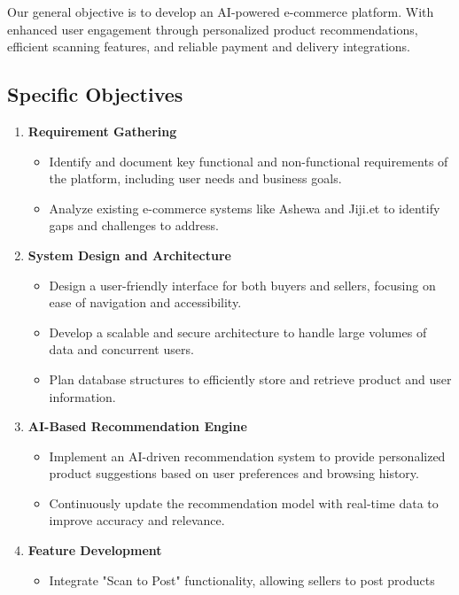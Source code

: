 \documentclass[12pt]{report}
\begin{document}
Our general objective is to develop an AI-powered e-commerce platform. With enhanced user
engagement through personalized product recommendations, efficient scanning features, and
reliable payment and delivery integrations.

\subsection{Specific Objectives}

\begin{enumerate}
	\item \textbf{Requirement Gathering}
	      \begin{itemize}
		      \item Identify and document key functional and non-functional requirements
		            of the platform, including user needs and business goals.
		      \item Analyze existing e-commerce systems like Ashewa and Jiji.et to
		            identify gaps and challenges to address.
	      \end{itemize}
	\item \textbf{System Design and Architecture}
	      \begin{itemize}
		      \item Design a user-friendly interface for both buyers and sellers, focusing
		            on ease of navigation and accessibility.
		      \item Develop a scalable and secure architecture to handle large volumes of
		            data and concurrent users.
		      \item Plan database structures to efficiently store and retrieve product and
		            user information.
	      \end{itemize}
	\item \textbf{AI-Based Recommendation Engine}
	      \begin{itemize}
		      \item Implement an AI-driven recommendation system to provide
		            personalized product suggestions based on user preferences and
		            browsing history.
		      \item Continuously update the recommendation model with real-time data to
		            improve accuracy and relevance.
	      \end{itemize}
	\item \textbf{Feature Development}
	      \begin{itemize}
		      \item Integrate "Scan to Post" functionality, allowing sellers to post products

\end{itemize}
\end{enumerate}
\end{document}
